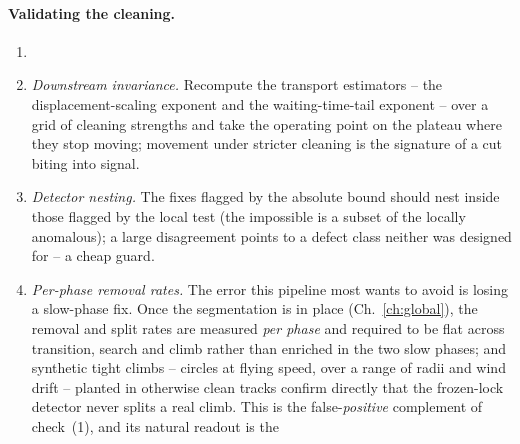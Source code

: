 \paragraph{Validating the cleaning.} 
\begin{enumerate}[label=(\arabic*), itemsep=2pt, topsep=3pt]
  \item {}
  \item \emph{Downstream invariance.} Recompute the transport estimators -- the
        displacement-scaling exponent and the waiting-time-tail exponent -- over a grid of
        cleaning strengths and take the operating point on the plateau where they stop
        moving; movement under stricter cleaning is the signature of a cut biting into
        signal.
  \item \emph{Detector nesting.} The fixes flagged by the absolute bound should nest
        inside those flagged by the local test (the impossible is a subset of the locally
        anomalous); a large disagreement points to a defect class neither was designed for
        -- a cheap guard.
  \item \emph{Per-phase removal rates.} The error this pipeline most wants to avoid is
        losing a slow-phase fix. Once the segmentation is in place
        (Ch.~\ref{ch:global}), the removal and split rates are measured \emph{per
        phase} and required to be flat across transition, search and climb rather than
        enriched in the two slow phases; and synthetic tight climbs -- circles at flying
        speed, over a range of radii and wind drift -- planted in otherwise clean tracks
        confirm directly that the frozen-lock detector never splits a real climb. This is
        the false-\emph{positive} complement of check~(1), and its natural readout is the

\end{enumerate}
